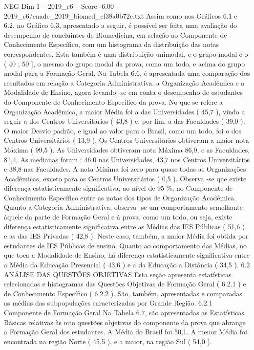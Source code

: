 \begin{textsample}{NEG Dim 1 – 2019\_c6 – Score -6.00 – 2019\_c6/enade\_2019\_biomed\_ef38a0b72c.txt}
Assim como nos Gráficos 6.1 e 6.2, no Gráfico 6.3, apresentado a seguir, é possível ser feita uma avaliação do desempenho de concluintes de Biomedicina, em relação ao Componente de Conhecimento Específico, com um histograma da distribuição das notas correspondentes.
Esta também é uma distribuição unimodal, e o grupo modal é o ( 40 ; 50 ], o mesmo do grupo modal da prova, como um todo, e acima do grupo modal para a Formação Geral.
Na Tabela 6.6, é apresentada uma comparação dos resultados em relação a Categoria Administrativa, a Organização Acadêmica e a Modalidade de Ensino, agora levando -se em conta o desempenho de estudantes do Componente de Conhecimento Específico da prova.
No que se refere a Organização Acadêmica, a maior Média foi a das Universidades ( 45,7 ), vindo a seguir a dos Centros Universitários ( 43,8 ) e, por fim, a das Faculdades ( 39,0 ).
O maior Desvio padrão, e igual ao valor para o Brasil, como um todo, foi o dos Centros Universitários ( 13,9 ).
Os Centros Universitários obtiveram a maior nota Máxima ( 99,5 ).
As Universidades obtiveram nota Máxima 86,9, e as Faculdades, 81,4.
As medianas foram : 46,0 nas Universidades, 43,7 nos Centros Universitários e 38,8 nas Faculdades.
A nota Mínima foi zero para quase todas as Organizações Acadêmicas, exceto para os Centros Universitários ( 0,5 ).
Observa -se que existe diferença estatisticamente significativa, ao nível de 95 \%, no Componente de Conhecimento Específico entre as notas dos tipos de Organização Acadêmica.
Quanto a Categoria Administrativa, observa -se um comportamento semelhante àquele da parte de Formação Geral e à prova, como um todo, ou seja, existe diferença estatisticamente significativa entre as Médias das IES Públicas ( 51,6 ) e as das IES Privadas ( 42,8 ).
Neste caso, também, a maior Média foi obtida por estudantes de IES Públicas de ensino.
Quanto ao comportamento das Médias, no que toca a Modalidade de Ensino, há diferença estatisticamente significativa entre a Média da Educação Presencial ( 43,6 ) e a da Educação a Distância ( 34,5 ). 6.2 ANÁLISE DAS QUESTÕES OBJETIVAS Esta seção apresenta estatísticas selecionadas e histogramas das Questões Objetivas de Formação Geral ( 6.2.1 ) e de Conhecimento Específico ( 6.2.2 ).
São, também, apresentadas e comparadas as médias das subpopulações caracterizadas por Grande Região. 6.2.1 Componente de Formação Geral Na Tabela 6.7, são apresentadas as Estatísticas Básicas relativas às oito questões objetivas do componente da prova que abrange a Formação Geral dos estudantes.
A Média do Brasil foi 50,1.
A menor Média foi encontrada na região Norte ( 45,5 ), e a maior, na região Sul ( 54,0 ).

\end{textsample}
